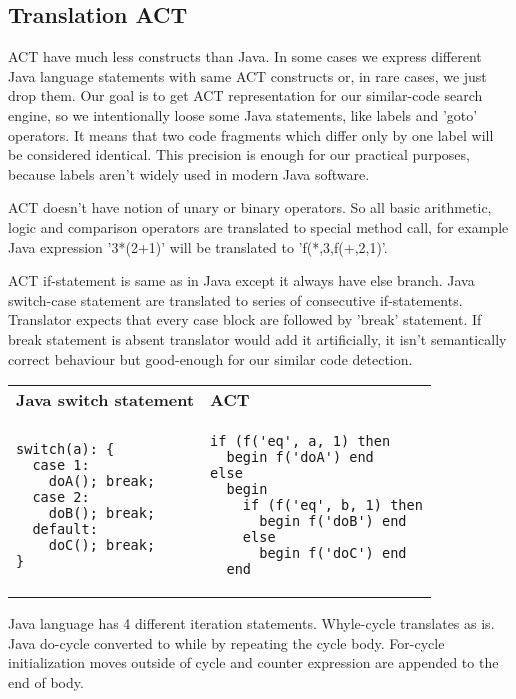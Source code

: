 \subsection{Translation ACT}

ACT have much less constructs than Java. 
In some cases we express different Java language statements with same ACT constructs or, in rare cases, we just drop
them.
Our goal is to get ACT representation for our similar-code search engine, so we intentionally loose some Java
statements, like labels and 'goto' operators.
It means that two code fragments which differ only by one label will be considered identical.
This precision is enough for our practical purposes, because labels aren't widely used in modern Java software.

ACT doesn't have notion of unary or binary operators. 
So all basic arithmetic, logic and comparison operators are translated to special method call, for example Java
expression '3*(2+1)' will be translated to 'f(*,3,f(+,2,1)'.

ACT if-statement is same as in Java except it always have else branch.
Java switch-case statement are translated to series of consecutive if-statements.
Translator expects that every case block are followed by 'break' statement.
If break statement is absent translator would add it artificially, it isn't semantically correct behaviour but
good-enough for our similar code detection. \\

\renewcommand{\arraystretch}{0.01}
\begin{tabular}{ p{6cm} p{6cm} }
\textbf{Java switch statement} & \textbf{ACT} \\
\begin{verbatim}
switch(a): {
  case 1:
  	doA(); break;
  case 2:
    doB(); break;
  default:
  	doC(); break;
}
\end{verbatim} 
  &
\begin{verbatim}
if (f('eq', a, 1) then 
  begin f('doA') end
else 
  begin
    if (f('eq', b, 1) then
      begin f('doB') end 
    else
      begin f('doC') end
  end
\end{verbatim}
\end{tabular}


Java language has 4 different iteration statements\cite{gosling05}. Whyle-cycle translates as is. Java do-cycle converted to
while by repeating the cycle body. For-cycle initialization moves outside of cycle and counter expression are
appended to the end of body.\\

